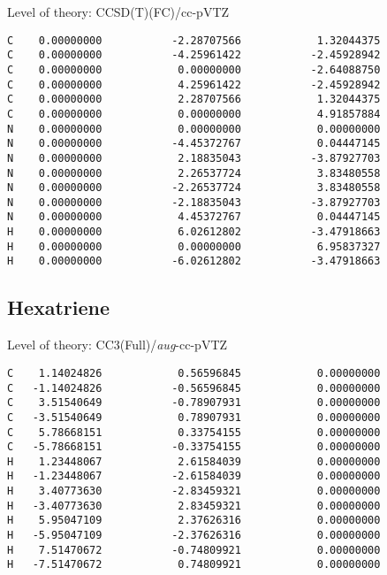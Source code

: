 \documentclass[journal=jctcce,manuscript=article,layout=traditional]{achemso}
\newcommand{\TZ}{cc-pVTZ}
\newcommand{\AVTZ}{\emph{aug}-cc-pVTZ}
\begin{document}
\begin{singlespace} 
Level of theory: CCSD(T)(FC)/{\TZ}
\begin{verbatim}
C    0.00000000           -2.28707566            1.32044375
C    0.00000000           -4.25961422           -2.45928942
C    0.00000000            0.00000000           -2.64088750
C    0.00000000            4.25961422           -2.45928942
C    0.00000000            2.28707566            1.32044375
C    0.00000000            0.00000000            4.91857884
N    0.00000000            0.00000000            0.00000000
N    0.00000000           -4.45372767            0.04447145
N    0.00000000            2.18835043           -3.87927703
N    0.00000000            2.26537724            3.83480558
N    0.00000000           -2.26537724            3.83480558
N    0.00000000           -2.18835043           -3.87927703
N    0.00000000            4.45372767            0.04447145
H    0.00000000            6.02612802           -3.47918663
H    0.00000000            0.00000000            6.95837327
H    0.00000000           -6.02612802           -3.47918663
\end{verbatim}
\end{singlespace} 

\subsection*{Hexatriene}

\begin{singlespace}
Level of theory: CC3(Full)/{\AVTZ}
\begin{verbatim}
C    1.14024826            0.56596845            0.00000000
C   -1.14024826           -0.56596845            0.00000000
C    3.51540649           -0.78907931            0.00000000
C   -3.51540649            0.78907931            0.00000000
C    5.78668151            0.33754155            0.00000000
C   -5.78668151           -0.33754155            0.00000000
H    1.23448067            2.61584039            0.00000000
H   -1.23448067           -2.61584039            0.00000000
H    3.40773630           -2.83459321            0.00000000
H   -3.40773630            2.83459321            0.00000000
H    5.95047109            2.37626316            0.00000000
H   -5.95047109           -2.37626316            0.00000000
H    7.51470672           -0.74809921            0.00000000
H   -7.51470672            0.74809921            0.00000000
\end{verbatim}
\end{singlespace}
\end{document}
